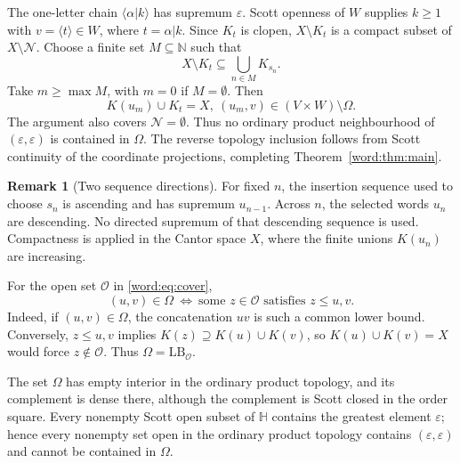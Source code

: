 \documentclass[10pt,a4paper]{article}
\theoremstyle{definition}
\newtheorem{remark}[theorem]{Remark}
\newcommand{\N}{\mathbb N}
\newcommand{\HH}{\mathbb H}
\begin{document}
The one-letter chain $\langle\alpha|k\rangle$ has supremum $\varepsilon$. Scott openness of $W$ supplies $k\geq1$ with $v=\langle t\rangle\in W$, where $t=\alpha|k$. Since $K_t$ is clopen, $X\setminus K_t$ is a compact subset of $X\setminus\mathcal N$. Choose a finite set $M\subseteq\N$ such that
\[
 X\setminus K_t\subseteq\bigcup_{n\in M}K_{s_n}.
\]
Take $m\geq\max M$, with $m=0$ if $M=\emptyset$. Then
\begin{equation}\label{word:eq:rectangle}
 K(u_m)\cup K_t=X,
 ~
 (u_m,v)\in(V\times W)\setminus\Omega.
\end{equation}
The argument also covers $\mathcal N=\emptyset$. Thus no ordinary product neighbourhood of $(\varepsilon,\varepsilon)$ is contained in $\Omega$. The reverse topology inclusion follows from Scott continuity of the coordinate projections, completing Theorem~\ref{word:thm:main}.

\begin{remark}[Two sequence directions]
For fixed $n$, the insertion sequence used to choose $s_n$ is ascending and has supremum $u_{n-1}$. Across $n$, the selected words $u_n$ are descending. No directed supremum of that descending sequence is used. Compactness is applied in the Cantor space $X$, where the finite unions $K(u_n)$ are increasing.
\end{remark}

For the open set $\mathcal O$ in \eqref{word:eq:cover},
\[
 (u,v)\in\Omega
 ~\Longleftrightarrow~
 \text{some }z\in\mathcal O\text{ satisfies }z\leq u,v.
\]
Indeed, if $(u,v)\in\Omega$, the concatenation $uv$ is such a common lower bound. Conversely, $z\leq u,v$ implies $K(z)\supseteq K(u)\cup K(v)$, so $K(u)\cup K(v)=X$ would force $z\notin\mathcal O$. Thus $\Omega=\mathrm{LB}_{\mathcal O}$.

The set $\Omega$ has empty interior in the ordinary product topology, and its complement is dense there, although the complement is Scott closed in the order square. Every nonempty Scott open subset of $\HH$ contains the greatest element $\varepsilon$; hence every nonempty set open in the ordinary product topology contains $(\varepsilon,\varepsilon)$ and cannot be contained in $\Omega$.
\end{document}
